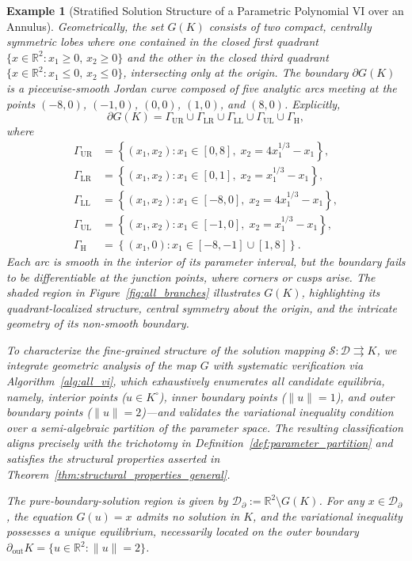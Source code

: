 \documentclass[sn-basic,Numbered]{sn-jnl}
\theoremstyle{thmstyleone}%
\newtheorem{example}{Example}%
\begin{document}
\begin{example}[Stratified Solution Structure of a Parametric Polynomial VI over an Annulus]
Geometrically, the set $G(K)$ consists of two compact, centrally symmetric lobes where one contained in the closed first quadrant $\{x \in \mathbb{R}^2 : x_1 \geq 0,\, x_2 \geq 0\}$ and the other in the closed third quadrant $\{x \in \mathbb{R}^2 : x_1 \leq 0,\, x_2 \leq 0\}$, intersecting only at the origin. The boundary $\partial G(K)$ is a piecewise-smooth Jordan curve composed of five analytic arcs meeting at the points $(-8,0)$, $(-1,0)$, $(0,0)$, $(1,0)$, and $(8,0)$. Explicitly,
\[
\partial G(K) = \Gamma_{\mathrm{UR}} \cup \Gamma_{\mathrm{LR}} \cup \Gamma_{\mathrm{LL}} \cup \Gamma_{\mathrm{UL}} \cup \Gamma_{\mathrm{H}},
\]
where
\begin{align*}
\Gamma_{\mathrm{UR}} &= \left\{ (x_1, x_2) : x_1 \in [0,8],\; x_2 = 4x_1^{1/3} - x_1 \right\}, \\
\Gamma_{\mathrm{LR}} &= \left\{ (x_1, x_2) : x_1 \in [0,1],\; x_2 = x_1^{1/3} - x_1 \right\}, \\
\Gamma_{\mathrm{LL}} &= \left\{ (x_1, x_2) : x_1 \in [-8,0],\; x_2 = 4x_1^{1/3} - x_1 \right\}, \\
\Gamma_{\mathrm{UL}} &= \left\{ (x_1, x_2) : x_1 \in [-1,0],\; x_2 = x_1^{1/3} - x_1 \right\}, \\
\Gamma_{\mathrm{H}}  &= \left\{ (x_1, 0) : x_1 \in [-8,-1] \cup [1,8] \right\}.
\end{align*}
Each arc is smooth in the interior of its parameter interval, but the boundary fails to be differentiable at the junction points, where corners or cusps arise. The shaded region in Figure~\ref{fig:all_branches} illustrates $G(K)$, highlighting its quadrant-localized structure, central symmetry about the origin, and the intricate geometry of its non-smooth boundary.

To characterize the fine-grained structure of the solution mapping $\mathcal{S} : \mathcal{D} \rightrightarrows K$, we integrate geometric analysis of the map $G$ with systematic verification via Algorithm~\ref{alg:all_vi}, which exhaustively enumerates all candidate equilibria, namely, interior points ($u \in K^\circ$), inner boundary points ($\|u\| = 1$), and outer boundary points ($\|u\| = 2$)—and validates the variational inequality condition over a semi-algebraic partition of the parameter space. The resulting classification aligns precisely with the trichotomy in Definition~\ref{def:parameter_partition} and satisfies the structural properties asserted in Theorem~\ref{thm:structural_properties_general}.

The pure-boundary-solution region is given by $\mathcal{D}_{\partial} := \mathbb{R}^2 \setminus G(K)$. For any $x \in \mathcal{D}_{\partial}$, the equation $G(u) = x$ admits no solution in $K$, and the variational inequality possesses a unique equilibrium, necessarily located on the outer boundary $\partial_{\mathrm{out}} K = \{ u \in \mathbb{R}^2 : \|u\| = 2 \}$.


\end{example}
\end{document}
